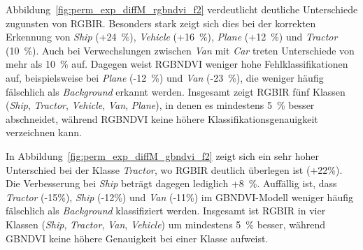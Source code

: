 %     

Abbildung~\ref{fig:perm_exp_diffM_rgbndvi_f2} verdeutlicht deutliche Unterschiede zugunsten von RGBIR. Besonders stark zeigt sich dies bei der korrekten Erkennung von \textit{Ship} (+24~\%), \textit{Vehicle} (+16~\%), \textit{Plane} (+12~\%) und \textit{Tractor} (10~\%). Auch bei Verwechslungen zwischen \textit{Van} mit \textit{Car} treten Unterschiede von mehr als 10~\% auf. Dagegen weist RGBNDVI weniger hohe Fehlklassifikationen auf, beispielsweise bei \textit{Plane} (-12~\%) und \textit{Van} (-23~\%), die weniger häufig fälschlich als \textit{Background} erkannt werden. Insgesamt zeigt RGBIR fünf Klassen (\textit{Ship}, \textit{Tractor}, \textit{Vehicle}, \textit{Van}, \textit{Plane}), in denen es mindestens 5~\% besser abschneidet, während RGBNDVI keine höhere Klassifikationsgenauigkeit verzeichnen kann.

%     

In Abbildung~\ref{fig:perm_exp_diffM_gbndvi_f2} zeigt sich ein sehr hoher Unterschied bei der Klasse \textit{Tractor}, wo RGBIR deutlich überlegen ist (+22\%). Die Verbesserung bei \textit{Ship} beträgt dagegen lediglich +8~\%. Auffällig ist, dass \textit{Tractor} (-15\%), \textit{Ship} (-12\%) und \textit{Van} (-11\%) im GBNDVI-Modell weniger häufig fälschlich als \textit{Background} klassifiziert werden. Insgesamt ist RGBIR in vier Klassen (\textit{Ship}, \textit{Tractor}, \textit{Van}, \textit{Vehicle}) um mindestens 5~\% besser, während GBNDVI keine höhere Genauigkeit bei einer Klasse aufweist.

%     

